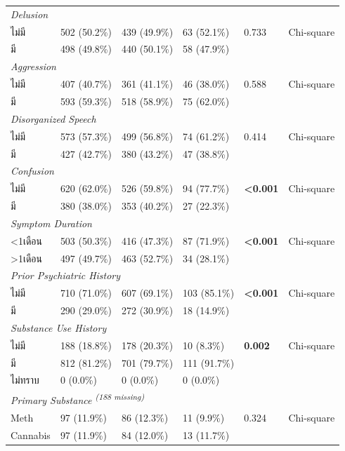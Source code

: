\begin{table}[htbp]
\begin{tabular}{llllll}
\multicolumn{6}{l}{\textit{Delusion}} \\
\quad ไม่มี & 502 (50.2\%) & 439 (49.9\%) & 63 (52.1\%) & 0.733 & Chi-square \\
\quad มี & 498 (49.8\%) & 440 (50.1\%) & 58 (47.9\%) &  &  \\
\multicolumn{6}{l}{\textit{Aggression}} \\
\quad ไม่มี & 407 (40.7\%) & 361 (41.1\%) & 46 (38.0\%) & 0.588 & Chi-square \\
\quad มี & 593 (59.3\%) & 518 (58.9\%) & 75 (62.0\%) &  &  \\
\multicolumn{6}{l}{\textit{Disorganized Speech}} \\
\quad ไม่มี & 573 (57.3\%) & 499 (56.8\%) & 74 (61.2\%) & 0.414 & Chi-square \\
\quad มี & 427 (42.7\%) & 380 (43.2\%) & 47 (38.8\%) &  &  \\
\multicolumn{6}{l}{\textit{Confusion}} \\
\quad ไม่มี & 620 (62.0\%) & 526 (59.8\%) & 94 (77.7\%) & \textbf{<0.001} & Chi-square \\
\quad มี & 380 (38.0\%) & 353 (40.2\%) & 27 (22.3\%) &  &  \\
\multicolumn{6}{l}{\textit{Symptom Duration}} \\
\quad \textless{}1เดือน & 503 (50.3\%) & 416 (47.3\%) & 87 (71.9\%) & \textbf{<0.001} & Chi-square \\
\quad \textgreater{}1เดือน & 497 (49.7\%) & 463 (52.7\%) & 34 (28.1\%) &  &  \\
\multicolumn{6}{l}{\textit{Prior Psychiatric History}} \\
\quad ไม่มี & 710 (71.0\%) & 607 (69.1\%) & 103 (85.1\%) & \textbf{<0.001} & Chi-square \\
\quad มี & 290 (29.0\%) & 272 (30.9\%) & 18 (14.9\%) &  &  \\
\multicolumn{6}{l}{\textit{Substance Use History}} \\
\quad ไม่มี & 188 (18.8\%) & 178 (20.3\%) & 10 (8.3\%) & \textbf{0.002} & Chi-square \\
\quad มี & 812 (81.2\%) & 701 (79.7\%) & 111 (91.7\%) &  &  \\
\quad ไม่ทราบ & 0 (0.0\%) & 0 (0.0\%) & 0 (0.0\%) &  &  \\
\multicolumn{6}{l}{\textit{Primary Substance \textsuperscript{(188 missing)}}} \\
\quad Meth & 97 (11.9\%) & 86 (12.3\%) & 11 (9.9\%) & 0.324 & Chi-square \\
\quad Cannabis & 97 (11.9\%) & 84 (12.0\%) & 13 (11.7\%) &  &  \\

\end{tabular}
\end{table}
